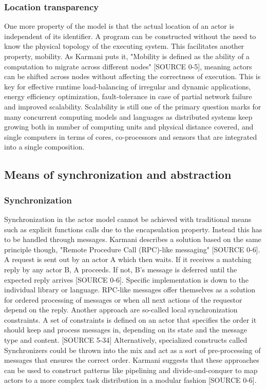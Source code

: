 \documentclass[A4]{article}
\begin{document}
\subsubsection{Location transparency}
One more property of the model is that the actual location of an actor is independent of its identifier. A program can be constructed without the need to know the physical topology of the executing system. This facilitates another property, mobility.
As Karmani puts it, "Mobility is defined as the ability of a computation to migrate across different nodes" [SOURCE 0-5], meaning actors can be shifted across nodes without affecting the correctness of execution. This is key for effective runtime load-balancing of irregular and dynamic applications, energy efficiency optimization, fault-tolerance in case of partial network failure and improved scalability. Scalability is still one of the primary question marks for many concurrent computing models and languages as distributed systems keep growing both in number of computing units and physical distance covered, and single computers in terms of cores, co-processors and sensors that are integrated into a single composition. 

\subsection{Means of synchronization and abstraction}
\subsubsection{Synchronization}
Synchronization in the actor model cannot be achieved with traditional means such as explicit functions calls due to the encapsulation property. Instead this has to be handled through messages. Karmani describes a solution based on the same principle though, "Remote Procedure Call (RPC)-like messaging" [SOURCE 0-6]. A request is sent out by an actor A which then waits. If it receives a matching reply by any actor B, A proceeds. If not, B's message is deferred until the expected reply arrives [SOURCE 0-6]. Specific implementation is down to the individual library or language.
RPC-like messages offer themselves as a solution for ordered processing of messages or when all next actions of the requestor depend on the reply. 
Another approach are so-called local synchronization constraints. A set of constraints is defined on an actor that specifies the order it should keep and process messages in, depending on its state and the message type and content. [SOURCE 5-34]
Alternatively, specialized constructs called Synchronizers could be thrown into the mix and act as a sort of pre-processing of messages that ensures the correct order.
Karmani suggests that these approaches can be used to construct patterns like pipelining and divide-and-conquer to map actors to a more complex task distribution in a modular fashion [SOURCE 0-6].
\end{document}
